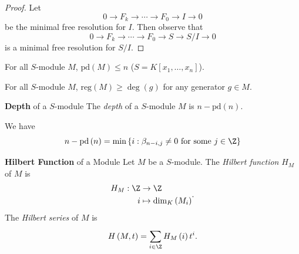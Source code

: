 \documentclass[co439]{subfiles}
\begin{document}
    \begin{proof}
        Let
        \begin{equation*}
            0\to F_k\to \cdots \to F_0\to I\to 0
        \end{equation*}
        be the minimal free resolution for $I$. Then observe that
        \begin{equation*}
            0\to F_k\to \cdots\to F_0\to S\to S /I\to 0
        \end{equation*}
        is a minimal free resolution for $S /I$.
    \end{proof}

    \begin{lemma}{}
        For all $S$-module $M$, $\text{pd}\left( M \right)\leq n$ ($S=K\left[ x_1,\ldots,x_n \right]$).
    \end{lemma}

    \rruleline

    \begin{lemma}{}
        For all $S$-module $M$, $\text{reg}\left( M \right) \geq \deg\left( g \right)$ for any generator $g\in M$.
    \end{lemma}

    \rruleline

    \begin{definition}{\textbf{Depth} of a $S$-module}
        The \emph{depth} of a $S$-module $M$ is $n-\text{pd}\left( n \right)$. 
    \end{definition}

    \np We have
    \begin{equation*}
        n-\text{pd}\left( n \right) = \min\left\lbrace i: \beta_{n-i,j}\neq 0 \text{ for some $j\in\Z$} \right\rbrace
    \end{equation*}
    
    \begin{definition}{\textbf{Hilbert Function} of a Module}
        Let $M$ be a $S$-module. The \emph{Hilbert function} $H_M$ of $M$ is
        \begin{equation*}
            \begin{aligned}
                H_M:\Z&\to\Z\\
                i&\mapsto\dim_K\left( M_i \right)
            \end{aligned} .
        \end{equation*}
        The \emph{Hilbert series} of $M$ is
        \begin{equation*}
            H\left( M,t \right) = \sum^{}_{i\in\Z} H_M\left( i \right)t^i.
        \end{equation*}
    \end{definition}
    
\end{document}
